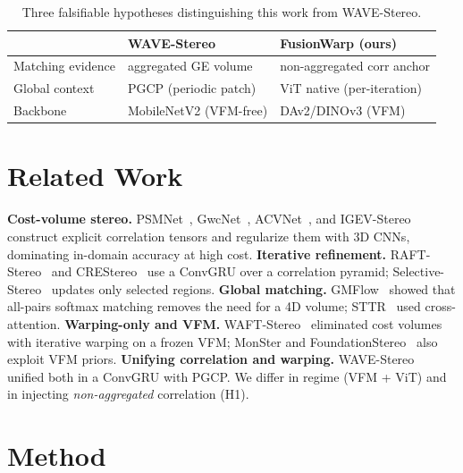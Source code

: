 \documentclass[conference]{IEEEtran}
\begin{document}
\begin{table}[t]
\centering
\caption{Three falsifiable hypotheses distinguishing this work from WAVE-Stereo.}
\label{tab:hyp}
\begin{tabular}{@{}lll@{}}
\toprule
 & \textbf{WAVE-Stereo} & \textbf{FusionWarp (ours)} \\
\midrule
Matching evidence & aggregated GE volume & non-aggregated corr anchor \\
Global context & PGCP (periodic patch) & ViT native (per-iteration) \\
Backbone & MobileNetV2 (VFM-free) & DAv2/DINOv3 (VFM) \\
\bottomrule
\end{tabular}
\end{table}

\section{Related Work}
\noindent\textbf{Cost-volume stereo.} PSMNet~\cite{psmnet}, GwcNet~\cite{gwcnet}, ACVNet~\cite{acvnet}, and IGEV-Stereo~\cite{igev} construct explicit correlation tensors and regularize them with 3D CNNs, dominating in-domain accuracy at high cost. \textbf{Iterative refinement.} RAFT-Stereo~\cite{raftstereo} and CREStereo~\cite{crestereo} use a ConvGRU over a correlation pyramid; Selective-Stereo~\cite{selective} updates only selected regions. \textbf{Global matching.} GMFlow~\cite{gmflow} showed that all-pairs softmax matching removes the need for a 4D volume; STTR~\cite{sttr} used cross-attention. \textbf{Warping-only and VFM.} WAFT-Stereo~\cite{waft} eliminated cost volumes with iterative warping on a frozen VFM; MonSter and FoundationStereo~\cite{foundation} also exploit VFM priors. \textbf{Unifying correlation and warping.} WAVE-Stereo~\cite{wave} unified both in a ConvGRU with PGCP. We differ in regime (VFM + ViT) and in injecting \emph{non-aggregated} correlation (H1).

\section{Method}
\end{document}
